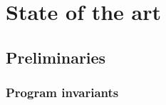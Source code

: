 \chapter{State of the art\label{sec:estado_del_arte}}

\section{Preliminaries}

\subsection{Program invariants}